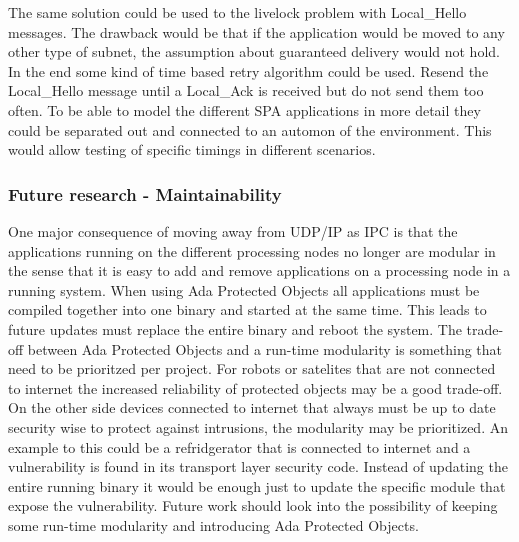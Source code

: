 The same solution could be used to the livelock problem with Local\_Hello
messages. The drawback would be that if the application would be moved to any
other type of subnet, the assumption about guaranteed delivery would not hold.
In the end some kind of time based retry algorithm could be used. Resend the
Local\_Hello message until a Local\_Ack is received but do not send them too
often. To be able to model the different SPA applications in more detail they
could be separated out and connected to an automon of the environment. This would
allow testing of specific timings in different scenarios.

%

\subsubsection{Future research - Maintainability}
One major consequence of moving away from UDP/IP as IPC is that the
applications running on the different processing nodes no longer are modular in
the sense that it is easy to add and remove applications on a processing node
in a running system. When using Ada Protected Objects all applications must be
compiled together into one binary and started at the same time. This leads to
future updates must replace the entire binary and reboot the system. The
trade-off between Ada Protected Objects and a run-time modularity is something
that need to be prioritzed per project. For robots or satelites that are
not connected to internet the increased reliability of protected objects may be
a good trade-off. On the other side devices connected to internet that always
must be up to date security wise to protect against intrusions, the modularity
may be prioritized.  An example to this could be a refridgerator that is
connected to internet and a vulnerability is found in its transport layer
security code. Instead of updating the entire running binary it would be enough
just to update the specific module that expose the vulnerability. Future work
should look into the possibility of keeping some run-time modularity and
introducing Ada Protected Objects.

